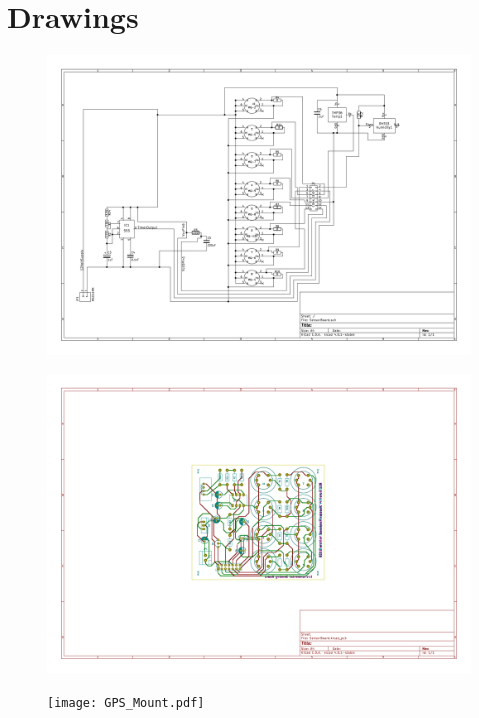 \appendixpagenumbering
\chapter{Drawings} \label{App:Drawings}

\begin{figure}[H]
	\centerline{\includegraphics[angle=90,width=0.9\linewidth]{images/SensorSchematic.pdf}}
\end{figure}

\begin{figure}[H]
	\centerline{\includegraphics[angle=90,width=1.0\linewidth]{images/completeboard.pdf}}
\end{figure}

\begin{figure}[H]
	\centerline{\texttt{[image: GPS\_Mount.pdf]}}
\end{figure}

